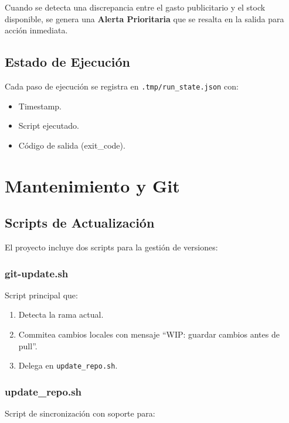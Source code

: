 \documentclass[a4paper,12pt]{article}
\begin{document}
Cuando se detecta una discrepancia entre el gasto publicitario y el stock disponible, se genera una \textbf{Alerta Prioritaria} que se resalta en la salida para acción inmediata.

\subsection{Estado de Ejecución}

Cada paso de ejecución se registra en \texttt{.tmp/run\_state.json} con:

\begin{itemize}
    \item Timestamp.
    \item Script ejecutado.
    \item Código de salida (exit\_code).
\end{itemize}

\section{Mantenimiento y Git}

\subsection{Scripts de Actualización}

El proyecto incluye dos scripts para la gestión de versiones:

\subsubsection{git-update.sh}

Script principal que:
\begin{enumerate}
    \item Detecta la rama actual.
    \item Commitea cambios locales con mensaje ``WIP: guardar cambios antes de pull''.
    \item Delega en \texttt{update\_repo.sh}.
\end{enumerate}

\subsubsection{update\_repo.sh}

Script de sincronización con soporte para:
\end{document}
